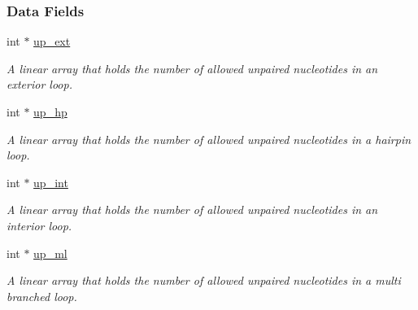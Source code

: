 \subsubsection*{Data Fields}
\begin{DoxyCompactItemize}
\item 
\mbox{\label{group__hard__constraints_a60094038af04093b2fee9b883266ff75}} 
int $\ast$ \mbox{\hyperlink{group__hard__constraints_a60094038af04093b2fee9b883266ff75}{up\+\_\+ext}}
\begin{DoxyCompactList}\small\item\em A linear array that holds the number of allowed unpaired nucleotides in an exterior loop. \end{DoxyCompactList}\item 
\mbox{\label{group__hard__constraints_a853255558e7e7d9eb382ac142ac8de3d}} 
int $\ast$ \mbox{\hyperlink{group__hard__constraints_a853255558e7e7d9eb382ac142ac8de3d}{up\+\_\+hp}}
\begin{DoxyCompactList}\small\item\em A linear array that holds the number of allowed unpaired nucleotides in a hairpin loop. \end{DoxyCompactList}\item 
\mbox{\label{group__hard__constraints_a455f994af0ec892d84fee1bf60d14a81}} 
int $\ast$ \mbox{\hyperlink{group__hard__constraints_a455f994af0ec892d84fee1bf60d14a81}{up\+\_\+int}}
\begin{DoxyCompactList}\small\item\em A linear array that holds the number of allowed unpaired nucleotides in an interior loop. \end{DoxyCompactList}\item 
\mbox{\label{group__hard__constraints_aa318079c2e3cfaca8dc589cc478d3b29}} 
int $\ast$ \mbox{\hyperlink{group__hard__constraints_aa318079c2e3cfaca8dc589cc478d3b29}{up\+\_\+ml}}
\begin{DoxyCompactList}\small\item\em A linear array that holds the number of allowed unpaired nucleotides in a multi branched loop. \end{DoxyCompactList}\item 
\mbox{\label{group__hard__constraints_a85714afbf27012165ec80c564bd62931}} 

\end{DoxyCompactItemize}
